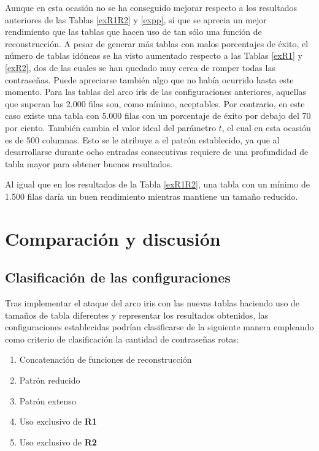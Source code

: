 \documentclass[12pt,spanish,listoffigures,listoftables]{tfgetsinf}
\begin{document}
Aunque en esta ocasión no se ha conseguido mejorar respecto a los resultados anteriores de las Tablas \ref{exR1R2} y \ref{expp}, sí que se aprecia un mejor rendimiento que las tablas que hacen uso de tan sólo una función de reconstrucción. A pesar de generar más tablas con malos porcentajes de éxito, el número de tablas idóneas se ha visto aumentado respecto a las Tablas \ref{exR1} y \ref{exR2}, dos de las cuales se han quedado muy cerca de romper todas las contraseñas. Puede apreciarse también algo que no había ocurrido hasta este momento. Para las tablas del arco iris de las configuraciones anteriores, aquellas que superan las 2.000 filas son, como mínimo, aceptables. Por contrario, en este caso existe una tabla con 5.000 filas con un porcentaje de éxito por debajo del 70 por ciento. También cambia el valor ideal del parámetro $t$, el cual en esta ocasión es de 500 columnas. Esto se le atribuye a el patrón establecido, ya que al desarrollarse durante ocho entradas consecutivas requiere de una profundidad de tabla mayor para obtener buenos resultados.

Al igual que en los resultados de la Tabla \ref{exR1R2}, una tabla con un mínimo de 1.500 filas daría un buen rendimiento mientras mantiene un tamaño reducido.

\section{Comparación y discusión}

\subsection{Clasificación de las configuraciones} \label{clasificación}

Tras implementar el ataque del arco iris con las nuevas tablas haciendo uso de tamaños de tabla diferentes y representar los resultados obtenidos, las configuraciones establecidas podrían clasificarse de la siguiente manera empleando como criterio de clasificación la cantidad de contraseñas rotas:

\begin{enumerate}

    \item Concatenación de funciones de reconstrucción
    
    \item Patrón reducido
    
    \item Patrón extenso
    
    \item Uso exclusivo de \textbf{R1}
    
    \item Uso exclusivo de \textbf{R2}
    
\end{enumerate}
\end{document}
